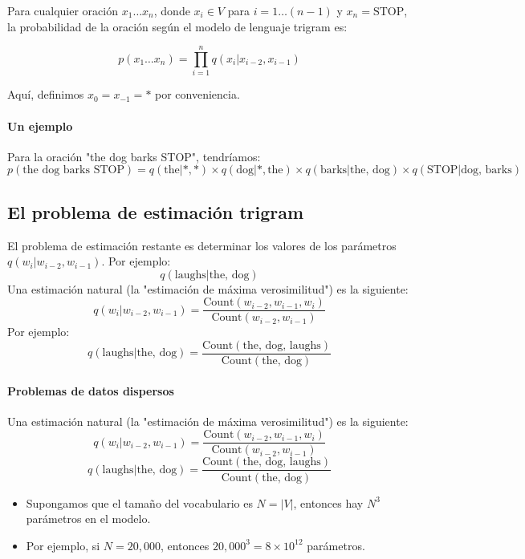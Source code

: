 Para cualquier oración $x_1 \ldots x_n$, donde $x_i \in V$ para $i = 1 \ldots (n-1)$ y $x_n = \text{STOP}$, la probabilidad de la oración según el modelo de lenguaje trigram es:

\[
p(x_1 \ldots x_n) = \prod_{i=1}^{n} q(x_i|x_{i-2}, x_{i-1})
\]

Aquí, definimos $x_0 = x_{-1} = *$ por conveniencia.

\paragraph{Un ejemplo}

Para la oración "the dog barks STOP", tendríamos:
\[
p(\text{the dog barks STOP}) = q(\text{the}|*, *) \times q(\text{dog}|*, \text{the}) \times q(\text{barks}|\text{the, dog}) \times q(\text{STOP}|\text{dog, barks})
\]

\subsection{El problema de estimación trigram}

El problema de estimación restante es determinar los valores de los parámetros $q(w_i | w_{i-2}, w_{i-1})$. Por ejemplo:
\[
q(\text{laughs} | \text{the, dog})
\]
Una estimación natural (la "estimación de máxima verosimilitud") es la siguiente:
\[
q(w_i | w_{i-2}, w_{i-1}) = \frac{{\text{Count}(w_{i-2}, w_{i-1}, w_i)}}{{\text{Count}(w_{i-2}, w_{i-1})}}
\]
Por ejemplo:
\[
q(\text{laughs} | \text{the, dog}) = \frac{{\text{Count}(\text{the, dog, laughs})}}{{\text{Count}(\text{the, dog})}}
\]

\paragraph{Problemas de datos dispersos}

Una estimación natural (la "estimación de máxima verosimilitud") es la siguiente:
\[
q(w_i | w_{i-2}, w_{i-1}) = \frac{{\text{Count}(w_{i-2}, w_{i-1}, w_i)}}{{\text{Count}(w_{i-2}, w_{i-1})}}
\]
\[
q(\text{laughs} | \text{the, dog}) = \frac{{\text{Count}(\text{the, dog, laughs})}}{{\text{Count}(\text{the, dog})}}
\]
\begin{itemize}
    \item Supongamos que el tamaño del vocabulario es $N = |V|$, entonces hay $N^3$ parámetros en el modelo.
    \item Por ejemplo, si $N = 20,000$, entonces $20,000^3 = 8 \times 10^{12}$ parámetros.
\end{itemize}

